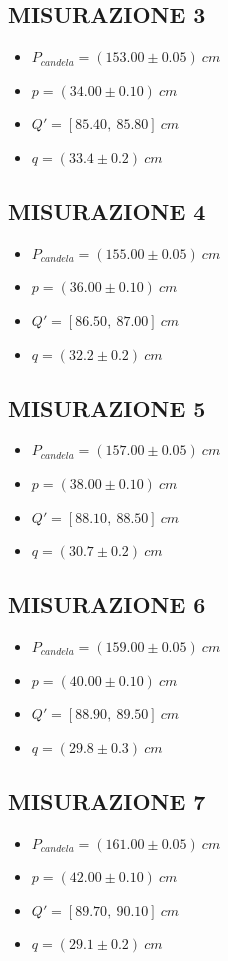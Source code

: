 \subsection{MISURAZIONE 3}
\begin{itemize}
	\item $P_{candela}=(153.00\pm 0.05)\ cm$
	\item $p = (34.00\pm 0.10)\ cm$
	\item $Q' = [85.40,\ 85.80]\ cm$
	\item $q = (33.4\pm 0.2)\ cm$
\end{itemize}

\subsection{MISURAZIONE 4}
\begin{itemize}
	\item $P_{candela}=(155.00\pm 0.05)\ cm$
	\item $p = (36.00\pm 0.10)\ cm$
	\item $Q' = [86.50,\ 87.00]\ cm$
	\item $q = (32.2\pm 0.2)\ cm$
\end{itemize}

\subsection{MISURAZIONE 5}
\begin{itemize}
	\item $P_{candela}=(157.00\pm 0.05)\ cm$
	\item $p = (38.00\pm 0.10)\ cm$
	\item $Q' = [88.10,\ 88.50]\ cm$
	\item $q = (30.7\pm 0.2)\ cm$
\end{itemize}

\subsection{MISURAZIONE 6}
\begin{itemize}
	\item $P_{candela}=(159.00\pm 0.05)\ cm$
	\item $p = (40.00\pm 0.10)\ cm$
	\item $Q' = [88.90,\ 89.50]\ cm$
	\item $q = (29.8\pm 0.3)\ cm$
\end{itemize}

\subsection{MISURAZIONE 7}
\begin{itemize}
	\item $P_{candela}=(161.00\pm 0.05)\ cm$
	\item $p = (42.00\pm 0.10)\ cm$
	\item $Q' = [89.70,\ 90.10]\ cm$
	\item $q = (29.1\pm 0.2)\ cm$
\end{itemize}

